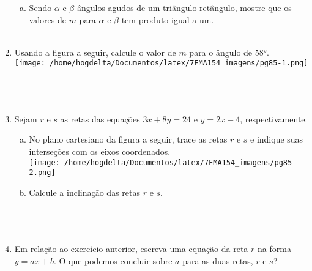 \documentclass[a4paper,14pt]{article}
\begin{document}
\begin{multicols}{2}
\begin{enumerate}
\begin{enumerate}[a)]
	    		\item Sendo $\alpha$ e $\beta$ ângulos agudos de um triângulo retângulo, mostre que os valores de $m$ para $\alpha$ e $\beta$ tem produto igual a um.\\\\
	    	\end{enumerate}
    	    \item Usando a figura a seguir, calcule o valor de $m$ para o ângulo de 58°.\\
    	    \texttt{[image: /home/hogdelta/Documentos/latex/7FMA154\_imagens/pg85-1.png]} \\\\\\\\
    	    \item Sejam $r$ e $s$ as retas das equações $3x + 8y = 24$ e $y = 2x - 4$, respectivamente.
    	    \begin{enumerate}[a)]
    	    	\item No plano cartesiano da figura a seguir, trace as retas $r$ e $s$ e indique suas interseções com os eixos coordenados.\\
    	    	\noindent
    	    	\texttt{[image: /home/hogdelta/Documentos/latex/7FMA154\_imagens/pg85-2.png]}
    	    	\item Calcule a inclinação das retas $r$ e $s$.\\\\\\\\
    	    \end{enumerate}
        	\item Em relação ao exercício anterior, escreva uma equação da reta $r$ na forma $y = ax + b$. O que podemos concluir sobre $a$ para as duas retas, $r$ e $s$?
   	    \end{enumerate}
    \end{multicols}
\end{document}
